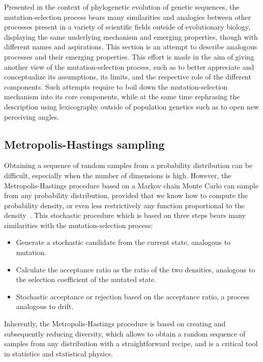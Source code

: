 Presented in the context of phylogenetic evolution of genetic sequences, the mutation-selection process bears many similarities and analogies between other processes present in a variety of scientific fields outside of evolutionary biology, displaying the same underlying mechanism and emerging properties, though with different names and aspirations.
This section is an attempt to describe analogous processes and their emerging properties.
This effort is made in the aim of giving another view of the mutation-selection process, such as to better appreciate and conceptualize its assumptions, its limits, and the respective role of the different components.
Such attempts require to boil down the mutation-selection mechanism into its core components, while at the same time rephrasing the description using lexicography outside of population genetics such as to open new perceiving angles.

\subsection{Metropolis-Hastings sampling}
Obtaining a sequence of random samples from a probability distribution can be difficult, especially when the number of dimensions is high.
However, the Metropolis-Hastings procedure based on a \gls{Markov chain Monte Carlo} can sample from any probability distribution, provided that we know how to compute the probability density, or even less restrictively any function proportional to the density~\citep{Hastings1970}.
This stochastic procedure which is based on three steps bears many similarities with the mutation-selection process:
\begin{itemize}
    \item Generate a stochastic candidate from the current state, analogous to mutation.
    \item Calculate the acceptance ratio as the ratio of the two densities, analogous to the selection coefficient of the mutated state.
    \item Stochastic acceptance or rejection based on the acceptance ratio, a process analogous to drift.
\end{itemize}
Inherently, the Metropolis-Hastings procedure is based on creating and subsequently reducing diversity, which allows to obtain a random sequence of samples from any distribution with a straightforward recipe, and is a critical
tool in statistics and statistical physics.


